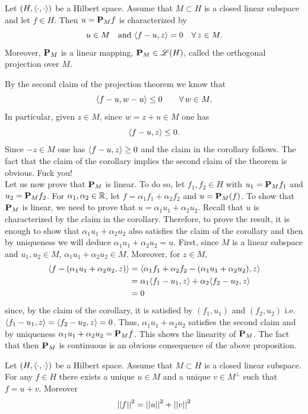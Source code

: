 \documentclass{article}
\begin{document}
\begin{corollary}
	Let $\left(H,\langle \cdot,\cdot \rangle\right)$ be a Hilbert space. Assume that $M\subset H$ is a closed linear subspace and let $f\in H$. Then $u=\mathbf{P}_{M}f$ is characterized by
	\begin{equation*}
		u\in M\quad\text{and }\langle f-u,z \rangle=0\quad\forall\, z\in M.
	\end{equation*}
	Moreover, $\mathbf{P}_{M}$ is a linear mapping, $\mathbf{P}_{M}\in\mathscr{L}(H)$, called the orthogonal projection over $M$.
\end{corollary}
\begin{fancyproof}
	By the second claim of the projection theorem we know that 
	\begin{equation*}
		\langle f-u,w-u \rangle\leq 0\qquad\forall\, w\in M.
	\end{equation*}
	In particular, given $z\in M$, since $w=z+u\in M$ one has
	\begin{equation*}
		\langle f-u,z \rangle\leq0.
	\end{equation*}
	Since $-z\in M$ one has $\langle f-u,z \rangle\geq0$ and the claim in the corollary follows. The fact that the claim of the corollary implies the second claim of the theorem is obvious. Fuck you!\\
	Let us now prove that $\mathbf{P}_{M}$ is linear. To do so, let $f_{1},f_{2}\in H$ with $u_{1}=\mathbf{P}_{M}f_{1}$ and $u_{2}=\mathbf{P}_{M}f_{2}$. For $\alpha_{1},\alpha_{2}\in\mathbb{R}$, let $f=\alpha_{1}f_{1}+\alpha_{2}f_{2}$ and $u=\mathbf{P}_{M}(f)$. To show that $\mathbf{P}_{M}$ is linear, we need to prove that $u=\alpha_{1}u_{1}+\alpha_{2}u_{2}$. Recall that $u$ is characterized by the claim in the corollary. Therefore, to prove the result, it is enough to show that $\alpha_{1}u_{1}+\alpha_{2}u_{2}$ also satisfies the claim of the corollary and then by uniqueness we will deduce $\alpha_{1}u_{1}+\alpha_{2}u_{2}=u$. First, since $M$ is a linear subspace and $u_{1},u_{2}\in M$, $\alpha_{1}u_{1}+\alpha_{2}u_{2}\in M$. Moreover, for $z\in M$,
	\begin{align*}
		\langle f-(\alpha_{1}u_{1}+\alpha_{2}u_{2},z) \rangle&=\langle \alpha_{1}f_{1}+\alpha_{2}f_{2}-(\alpha_{1}u_{1}+\alpha_{2}u_{2}),z \rangle\\
		&=\alpha_{1}\langle f_{1}-u_{1},z \rangle+\alpha_{2}\langle f_{2}-u_{2},z \rangle\\
		&=0
	\end{align*}
	since, by the claim of the corollary, it is satisfied by $(f_{1},u_{1})$ and $(f_{2},u_{2})$ i.e. $\langle f_{1}-u_{1},z \rangle=\langle f_{2}-u_{2},z \rangle=0$. Thus, $\alpha_{1}u_{1}+\alpha_{2}u_{2}$ satisfies the second claim and by uniqueness $\alpha_{1}u_{1}+\alpha_{2}u_{2}=\mathbf{P}_{M}f$. This shows the linearity of $\mathbf{P}_{M}$. The fact that then $\mathbf{P}_{M}$ is continuous is an obvious consequence of the above proposition.
\end{fancyproof}
\begin{corollary}
	Let $\left(H,\langle \cdot,\cdot \rangle\right)$ be a Hilbert space. Assume that $M\subset H$ is a closed linear subspace. For any $f\in H$ there exists a unique $u\in M$ and a unique $v\in M^{\perp}$ such that $f=u+v$. Moreover
	\begin{equation*}
		\left|\left|f\right|\right|^{2}=\left|\left|u\right|\right|^{2}+\left|\left|v\right|\right|^{2}
	\end{equation*}
\end{corollary}
\end{document}

